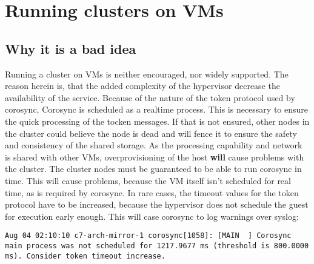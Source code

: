 \section{Running clusters on \acp{VM}}
\subsection{Why it is a bad idea}
Running a cluster on \acp{VM} is neither encouraged, nor widely supported.
The reason herein is, that the added complexity of the hypervisor decrease the availability
of the service. Because of the nature of the token protocol used by corosync,
Corosync is scheduled as a realtime process. This is necessary to ensure the quick
processing of the tocken messages. If that is not ensured, other nodes
in the cluster could believe the node is dead and will fence it to ensure the safety
and consistency of the shared storage.
As the processing capability and network is shared with other \acp{VM},
overprovisioning of the host \textbf{will} cause problems with the cluster.
The cluster nodes must be guaranteed to be able to run corosync in time.
This will cause problems, because the \ac{VM} itself isn't scheduled for real time,
as is required by corosync.
In rare cases, the timeout values for the token protocol have to be increased,
because the hypervisor does not schedule the guest for execution early enough.
This will case corosync to log warnings over syslog:
\begin{lstlisting}
Aug 04 02:10:10 c7-arch-mirror-1 corosync[1058]: [MAIN  ] Corosync main process was not scheduled for 1217.9677 ms (threshold is 800.0000 ms). Consider token timeout increase.
\end{lstlisting}
